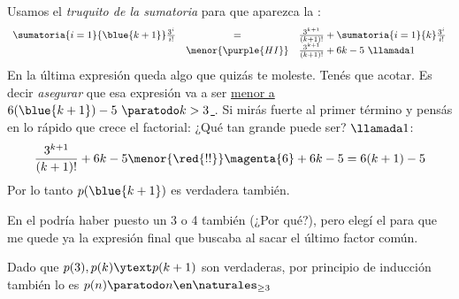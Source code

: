 \begin{enumerate}[label=\roman*)]
        Usamos el \textit{truquito de la sumatoria} para que aparezca la :
        $$
          \begin{array}{rcl}
            \sumatoria{i=1}{\blue{k + 1}} \frac{3^i}{i!}
             & =                   &
            \frac{3^{k+1}}{(k+1)!} + \sumatoria{i=1}{k} \frac{3^i}{i!} \\
             & \menor{\purple{HI}} &
            \frac{3^{k+1}}{(k+1)!} + 6k - 5 ~ \llamada1                \\
          \end{array}
        $$
        En la última expresión queda algo que quizás te moleste. Tenés que acotar. Es decir
        \textit{asegurar} que esa expresión va a ser \underline{menor a $6(\blue{k+1}) - 5 ~\paratodo k>3$ }. Si mirás fuerte
        al primer término y pensás en lo rápido que crece el factorial: ¿Qué tan grande puede ser?
        $\llamada1$:
        $$
          \frac{3^{k+1}}{(k+1)!} + 6k - 5 \menor{\red{!!}} \magenta{6} + 6k - 5 = 6(k+1) - 5
        $$
        Por lo tanto $p(\blue{k+1})$ es verdadera también.

        En el \red{!!} podría haber puesto un 3 o 4 también {\footnotesize(¿Por qué?)}, pero elegí el  para que me quede ya la expresión final que buscaba
        al sacar el último factor común.

        Dado que $p(3), p(k) \ytext p(k+1)$ son verdaderas, por principio de inducción también lo es $p(n) \paratodo n \en \naturales_{\geq 3}$

\end{enumerate}

\begin{aportes}
  \item {}
  \item {}
\end{aportes}
